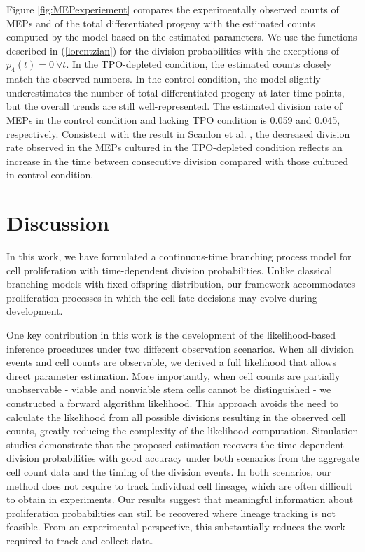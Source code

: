 \documentclass[pdflatex,sn-mathphys-num]{sn-jnl}
\theoremstyle{thmstyleone}%
\theoremstyle{thmstyletwo}%
\theoremstyle{thmstylethree}%
\begin{document}
Figure \ref{fig:MEPexperiement} compares the experimentally observed counts of MEPs and of the total differentiated progeny with the estimated counts computed by the model based on the estimated parameters. We use the functions described in (\ref{lorentzian}) for the division probabilities with the exceptions of $p_4(t) = 0 \ \forall t$. In the TPO-depleted condition, the estimated counts closely match the observed numbers. In the control condition, the model slightly underestimates the number of total differentiated progeny at later time points, but the overall trends are still well-represented. The estimated division rate of MEPs in the control condition and lacking TPO condition is 0.059 and 0.045, respectively. Consistent with the result in Scanlon et al. \cite{Sc2022}, the decreased division rate observed in the MEPs cultured in the TPO-depleted condition reflects an increase in the time between consecutive division compared with those cultured in control condition.

\section{Discussion} \label{discussion}
In this work, we have formulated a continuous-time branching process model for cell proliferation with time-dependent division probabilities. Unlike classical branching models with fixed offspring distribution, our framework accommodates proliferation processes in which the cell fate decisions may evolve during development.

One key contribution in this work is the development of the likelihood-based inference procedures under two different observation scenarios. When all division events and cell counts are observable, we derived a full likelihood that allows direct parameter estimation. More importantly, when cell counts are partially unobservable - viable and nonviable stem cells cannot be distinguished - we constructed a forward algorithm likelihood. This approach avoids the need to calculate the likelihood from all possible divisions resulting in the observed cell counts, greatly reducing the complexity of the likelihood computation. Simulation studies demonstrate that the proposed estimation recovers the time-dependent division probabilities with good accuracy under both scenarios from the aggregate cell count data and the timing of the division events. In both scenarios, our method does not require to track individual cell lineage, which are often difficult to obtain in experiments. Our results suggest that meaningful information about proliferation probabilities can still be recovered where lineage tracking is not feasible. From an experimental perspective, this substantially reduces the work required to track and collect data.
\end{document}
